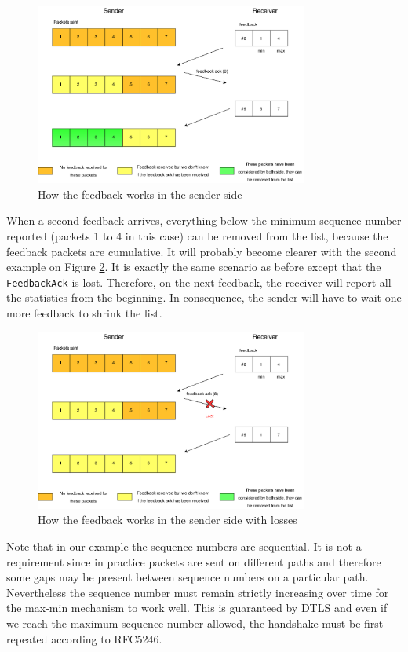 \begin{figure}[!ht]
\centering
\includegraphics[width=0.8\textwidth]{images/Feedback-implem1.eps}
\caption{How the feedback works in the sender side}
\label{fig:feedback-imp1}
\end{figure}


When a second feedback arrives, everything below the minimum sequence number reported (packets 1 to 4 in this case) can be removed from the list, because the feedback packets are cumulative. It will probably become clearer with the second example on Figure \ref{fig:feedback-imp2}. It is exactly the same scenario as before except that the \texttt{FeedbackAck} is lost. Therefore, on the next feedback, the receiver will report all the statistics from the beginning. In consequence, the sender will have to wait one more feedback to shrink the list.

\begin{figure}[!ht]
\centering
\includegraphics[width=0.8\textwidth]{images/Feedback-implem2.eps}
\caption{How the feedback works in the sender side with losses}
\label{fig:feedback-imp2}
\end{figure}

Note that in our example the sequence numbers are sequential. It is not a requirement since in practice packets are sent on different paths and therefore some gaps may be present between sequence numbers on a particular path. Nevertheless the sequence number must remain strictly increasing over time for the max-min mechanism to work well. This is guaranteed by DTLS and even if we reach the maximum sequence number allowed, the handshake must be first repeated according to RFC5246\cite{rfc5246}.

